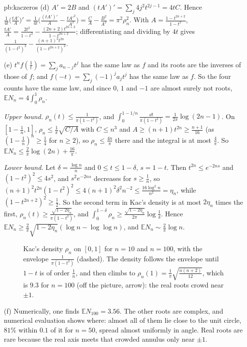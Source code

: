 \begin{solution}{pb:kaczeros}
(d) $A'=2B$ and $(tA')'=\sum_j4j^2t^{2j-1}=4tC$. Hence
$\frac1{4t}\bigl(\frac{tA'}A\bigr)'=\frac1{4t}\bigl(\frac{(tA')'}A-\frac{tA'^2}{A^2}\bigr)=\frac CA-\frac{B^2}{A^2}=\pi^2\rho_n^2$. With $A=\frac{1-t^{2n+2}}{1-t^2}$,
$\frac{tA'}A=\frac{2t^2}{1-t^2}-\frac{(2n+2)t^{2n+2}}{1-t^{2n+2}}$; differentiating and dividing by $4t$ gives $\frac1{(1-t^2)^2}-\frac{(n+1)^2t^{2n}}{(1-t^{2n+2})^2}$.

(e) $t^nf(\frac1t)=\sum_ja_{n-j}t^j$ has the same law as $f$ and its roots are the inverses of those of $f$; and $f(-t)=\sum_j(-1)^ja_jt^j$ has the same law as $f$. So the
four counts have the same law, and since $0$, $1$ and $-1$ are almost surely not roots, $\mathbb EN_n=4\int_0^1\rho_n$.

\emph{Upper bound.} $\rho_n(t)\le\frac1{\pi(1-t^2)}$, and $\int_0^{1-1/n}\frac{\dd t}{\pi(1-t^2)}=\frac1{2\pi}\log(2n-1)$. On $[1-\frac1n,1]$, $\rho_n\le\frac1\pi\sqrt{C/A}$ with
$C\le n^3$ and $A\ge(n+1)t^{2n}\ge\frac{n+1}{16}$ (as $(1-\frac1n)^n\ge\frac14$ for $n\ge2$), so $\rho_n\le\frac{4n}\pi$ there and the integral is at most $\frac4\pi$. So
$\mathbb EN_n\le\frac2\pi\log(2n)+\frac{16}\pi$.

\emph{Lower bound.} Let $\delta=\frac{\log n}n$ and $0\le t\le1-\delta$, $s=1-t$. Then $t^{2n}\le e^{-2ns}$ and $(1-t^2)^2\le4s^2$, and $s^2e^{-2ns}$ decreases for $s\ge\frac1n$, so
$(n+1)^2t^{2n}(1-t^2)^2\le4(n+1)^2\delta^2n^{-2}\le\frac{16\log^2n}{n^2}=\eta_n$, while $(1-t^{2n+2})^2\ge\frac12$. So the second term in Kac's density is at most $2\eta_n$ times the first,
$\rho_n(t)\ge\frac{\sqrt{1-2\eta_n}}{\pi(1-t^2)}$, and $\int_0^{1-\delta}\rho_n\ge\frac{\sqrt{1-2\eta_n}}{2\pi}\log\frac1\delta$. Hence $\mathbb EN_n\ge\frac2\pi\sqrt{1-2\eta_n}(\log n-\log\log n)$, and
$\mathbb EN_n\sim\frac2\pi\log n$.

\begin{figure}[ht]
\centering{}
\caption{Kac's density $\rho_n$ on $[0,1]$ for $n=10$ and $n=100$, with the envelope $\frac1{\pi(1-t^2)}$ (dashed). The density follows the envelope until $1-t$ is of order
$\frac1n$, and then climbs to $\rho_n(1)=\frac1\pi\sqrt{\frac{n(n+2)}{12}}$, which is $9.3$ for $n=100$ (off the picture, arrow): the real roots crowd near $\pm1$.}
\label{fig:kac}
\end{figure}

(f) Numerically, one finds $\mathbb EN_{100}=3.56$. The other roots are complex, and numerical evaluation shows where: almost all of them lie close to the unit circle, $81\%$ within
$0.1$ of it for $n=50$, spread almost uniformly in angle. Real roots are rare because the real axis meets that crowded annulus only near $\pm1$.


\end{solution}
